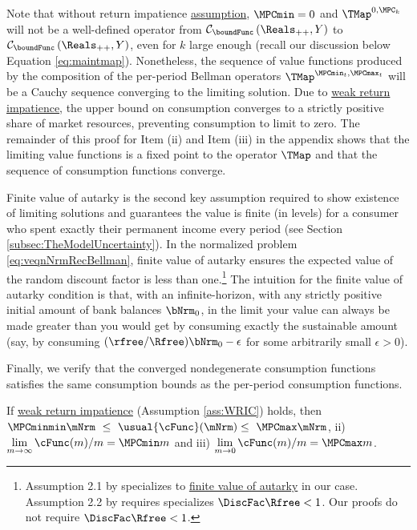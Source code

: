 \documentclass[BufferStockTheory]{subfiles}
\begin{document}

Note that without return impatience \hyperlink{RIC}{assumption}, $\MPCmin = 0$ and $\TMap^{0, \MPC_{k}}$ will not be a well-defined operator from  $\mathcal{C}_{\boundFunc }\left(\Reals_{++},Y\right)$ to $\mathcal{C}_{\boundFunc }\left(\Reals_{++},Y\right)$, even for $k$ large enough (recall our discussion below Equation \eqref{eq:maintmap}).
Nonetheless, the sequence of value functions produced by the composition of the per-period Bellman operators $\TMap^{\MPCmin_{t}, \MPCmax_{t}}$  will be a Cauchy sequence converging to the limiting solution.
Due to \hyperlink{WRIC}{weak return impatience}, the upper bound on consumption converges to a strictly positive share of market resources, preventing consumption to limit to zero.
The  remainder of this proof for Item (ii) and Item (iii) in the appendix shows that the limiting value functions is a fixed point to the operator $\TMap$ and that the sequence of consumption functions converge.


Finite value of autarky is the second key assumption required to show existence of limiting solutions and guarantees the value is finite (in levels) for a consumer who spent exactly their permanent income every period (see Section \ref{subsec:TheModelUncertainty}).
In the normalized problem \eqref{eq:veqnNrmRecBellman}, finite value of autarky ensures the expected value of the random discount factor is less than one.\footnote{Assumption 2.1 by \cite{mstIncFluct} specializes to \hyperlink{FVAC}{finite value of autarky} in our case.
Assumption 2.2 by \cite{mstIncFluct} requires specializes $\DiscFac\Rfree<1$.
Our proofs do not require $\DiscFac\Rfree<1$.} The intuition for the finite value of autarky condition is that, with an infinite-horizon, with any strictly positive initial amount of bank balances $\bNrm_{0}$, in the limit your value can always be made greater than you would get by consuming exactly the sustainable amount (say, by consuming $(\rfree/\Rfree)\bNrm_{0}-\epsilon$ for some arbitrarily small $\epsilon>0$).


Finally, we verify that the converged nondegenerate consumption functions satisfies the same consumption bounds as the per-period consumption functions.

\begin{claim}\label{claim:MPCBoundsConvg}
If \hyperlink{WRIC}{weak return impatience} (Assumption \ref{ass:WRIC}) holds, then $\MPCminmin  \mNrm ~ \leq  ~  \usual{\cFunc}(\mNrm)  \leq  ~ \MPCmax \mNrm$, ii) $\lim\limits_{m\rightarrow \infty} \cFunc (m)/m =\MPCmin m$ and iii) $\lim\limits_{m\rightarrow 0} \cFunc (m)/m =\MPCmax m$.  
\end{claim}
\end{document}
